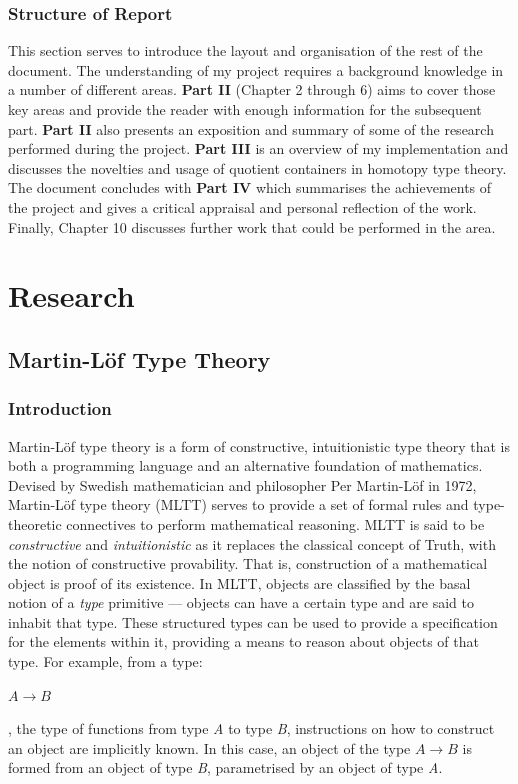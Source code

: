 \documentclass[12pt]{report}
\begin{document}
\section{Structure of Report}
This section serves to introduce the layout and organisation of the rest of the document. The understanding of my project requires a background knowledge in a number of different areas. \textbf{Part II} (Chapter 2 through 6) aims to cover those key areas and provide the reader with enough information for the subsequent part. \textbf{Part II} also presents an exposition and summary of some of the research performed during the project. \textbf{Part III} is an overview of my implementation and discusses the novelties and usage of quotient containers in homotopy type theory. The document concludes with \textbf{Part IV} which summarises the achievements of the project and gives a critical appraisal and personal reflection of the work. Finally, Chapter 10 discusses further work that could be performed in the area. 



\part{Research}
\chapter{Martin-L\"of Type Theory}
\section{Introduction}
Martin-L\"of type theory is a form of constructive, intuitionistic type theory that is both a programming language and an alternative foundation of mathematics. Devised by Swedish mathematician and philosopher Per Martin-L\"of in 1972, Martin-L\"of type theory (MLTT) serves to provide a set of formal rules and type-theoretic connectives to perform mathematical reasoning.
MLTT is said to be \textit{constructive} and \textit{intuitionistic} as it replaces the classical concept of Truth, with the notion of constructive provability. That is, construction of a mathematical object is proof of its existence. In MLTT, objects are classified by the basal notion of a \textit{type} primitive --- objects can have a certain type and are said to inhabit that type. These structured types can be used to provide a specification for the elements within it, providing a means to reason about objects of that type. For example, from a type:
\begin{center}
$A \rightarrow B$
\end{center}
, the type of functions from type \textit{A} to type \textit{B}, instructions on how to construct an object are implicitly known. In this case, an object of the type $A \rightarrow B$ is formed from an object of type \textit{B}, parametrised by an object of type \textit{A}.
\end{document}
